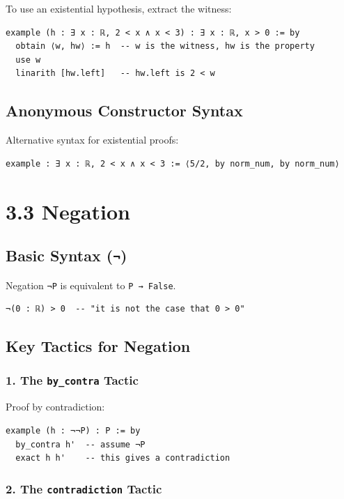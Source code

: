 \documentclass{amsart}
\theoremstyle{plain}
\theoremstyle{definition}
\theoremstyle{remark}
\begin{document}
To use an existential hypothesis, extract the witness:

\begin{lstlisting}[language=lean]
example (h : ∃ x : ℝ, 2 < x ∧ x < 3) : ∃ x : ℝ, x > 0 := by
  obtain ⟨w, hw⟩ := h  -- w is the witness, hw is the property
  use w
  linarith [hw.left]   -- hw.left is 2 < w
\end{lstlisting}
\subsection{Anonymous Constructor Syntax}

Alternative syntax for existential proofs:

\begin{lstlisting}[language=lean]
example : ∃ x : ℝ, 2 < x ∧ x < 3 := ⟨5/2, by norm_num, by norm_num⟩
\end{lstlisting}
\section{3.3 Negation}

\subsection{Basic Syntax (\lstinline{¬})}

Negation \lstinline{¬P} is equivalent to \lstinline{P → False}.

\begin{lstlisting}[language=lean]
¬(0 : ℝ) > 0  -- "it is not the case that 0 > 0"
\end{lstlisting}
\subsection{Key Tactics for Negation}

\subsubsection{1. The \lstinline{by_contra} Tactic}

Proof by contradiction:

\begin{lstlisting}[language=lean]
example (h : ¬¬P) : P := by
  by_contra h'  -- assume ¬P
  exact h h'    -- this gives a contradiction
\end{lstlisting}
\subsubsection{2. The \lstinline{contradiction} Tactic}
\end{document}
